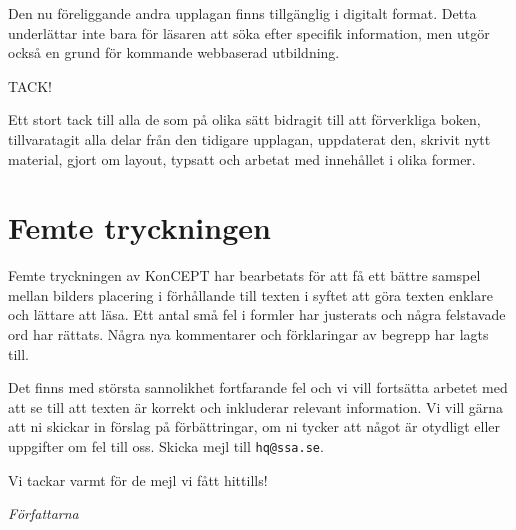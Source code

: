 Den nu föreliggande andra upplagan finns tillgänglig i digitalt format.
Detta underlättar inte bara för läsaren att söka efter specifik information,
men utgör också en grund för kommande webbaserad utbildning.

TACK!

Ett stort tack till alla de som på olika sätt bidragit till att förverkliga
boken, tillvaratagit alla delar från den tidigare upplagan, uppdaterat
den, skrivit nytt material, gjort om layout, typsatt och arbetat med
innehållet i olika former.

\section*{Femte tryckningen}

Femte tryckningen av KonCEPT har bearbetats för att få ett bättre samspel mellan
bilders placering i förhållande till texten i syftet att göra texten enklare och
lättare att läsa.
Ett antal små fel i formler har justerats och några felstavade ord har rättats.
Några nya kommentarer och förklaringar av begrepp har lagts till.

Det finns med största sannolikhet fortfarande fel och vi vill fortsätta arbetet
med att se till att texten är korrekt och inkluderar relevant information.
Vi vill gärna att ni skickar in förslag på förbättringar, om ni tycker att något
är otydligt eller uppgifter om fel till oss.
Skicka mejl till \texttt{hq@ssa.se}.

\medskip

Vi tackar varmt för de mejl vi fått hittills!

\bigskip

\noindent\emph{Författarna}
